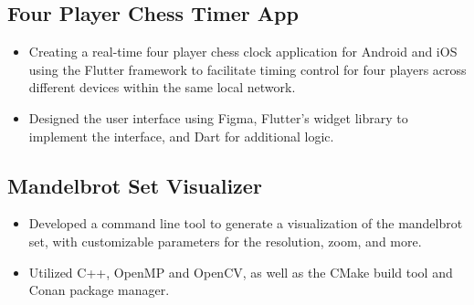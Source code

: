 \documentclass{article}
\begin{document}
\subsection*{Four Player Chess Timer App}

\begin{itemize}
	\item Creating a real-time four player chess clock application for Android and iOS using the Flutter framework to facilitate timing control for four players across different devices within the same local network. 
	\item Designed the user interface using Figma, \hspace{49152sp}Flutter's widget library to implement the interface, and Dart for additional logic.
\end{itemize}

\subsection*{Mandelbrot Set Visualizer}

\begin{itemize}
	\item Developed a command line tool to generate a visualization of the mandelbrot set, with customizable parameters for the resolution, zoom, and more.
	\item Utilized C++, OpenMP and OpenCV, as well as the CMake build tool and Conan package manager.
\end{itemize}


\end{document}
